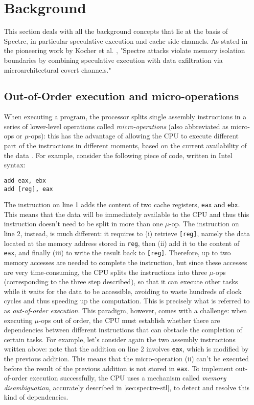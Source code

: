 \documentclass[12pt,a4paper]{book}
\theoremstyle{definition}
\begin{document}
	\section{Background}
	This section deals with all the background concepts that lie at the basis of Spectre, in particular speculative execution and cache side channels. As stated in the pioneering work by Kocher et al. \cite{Kocher2019}, "Spectre attacks violate memory isolation boundaries by combining speculative execution with data exfiltration via microarchitectural covert channels."
	\subsection{Out-of-Order execution and micro-operations}\label{ooo-exec}
	When executing a program, the processor splits single assembly instructions in a series of lower-level operations called \textit{micro-operations} (also abbreviated as micro-ops or $\mu$-ops): this has the advantage of allowing the CPU to execute different part of the instructions in different moments, based on the current availability of the data \cite{Fog2021}. For example, consider the following piece of code, written in Intel syntax:
	\begin{lstlisting}
add eax, ebx
add [reg], eax
	\end{lstlisting}
	The instruction on line 1 adds the content of two cache registers, \texttt{eax} and \texttt{ebx}. This means that the data will be immediately available to the CPU and thus this instruction doesn't need to be split in more than one $\mu$-op. The instruction on line 2, instead, is much different: it requires to (i) retrieve \texttt{[reg]}, namely the data located at the memory address stored in \texttt{reg}, then (ii) add it to the content of \texttt{eax}, and finally (iii) to write the result back to \texttt{[reg]}. Therefore, up to two memory accesses are needed to complete the instruction, but since these accesses are very time-consuming, the CPU splits the instructions into three $\mu$-ops (corresponding to the three step described), so that it can execute other tasks while it waits for the data to be accessible, avoiding to waste hundreds of clock cycles and thus speeding up the computation. This is precisely what is referred to as \textit{out-of-order execution}. This paradigm, however, comes with a challenge: when executing $\mu$-ops out of order, the CPU must establish whether there are dependencies between different instructions that can obstacle the completion of certain tasks.	For example, let's consider again the two assembly instructions written above: note that the addition on line 2 involves \texttt{eax}, which is modified by the previous addition. This means that the micro-operation (ii) can't be executed before the result of the previous addition is not stored in \texttt{eax}. To implement out-of-order execution successfully, the CPU uses a mechanism called \textit{memory disambiguation}, accurately described in \ref{sec:spectre-stl}, to detect and resolve this kind of dependencies. 
	
\end{document}
